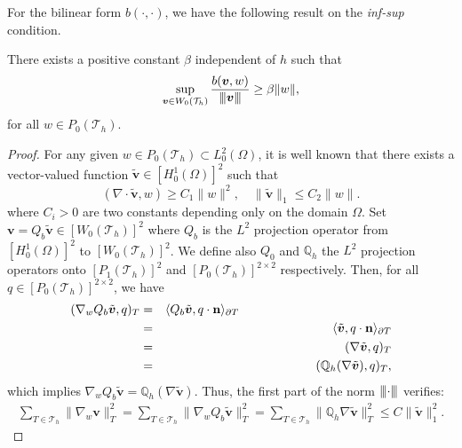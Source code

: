 \documentclass[final,leqno]{siamltex704}
\newcommand{\vertiii}[1]{{\left\vert\kern-0.25ex\left\vert\kern-0.25ex\left\vert #1
    \right\vert\kern-0.25ex\right\vert\kern-0.25ex\right\vert}}
\def\T{{\mathcal T}}
\def\bn{{\bf n}}
\begin{document}
For the bilinear form $b(\cdot,\cdot)$, we have the following result on the {\em inf-sup} condition.
\begin{lemma}\label{lemma.blinear.b}
There exists a positive constant $\beta$ independent of $h$ such that
\begin{eqnarray}\label{equ.infsup.infsup}
\sup_{\bm{v}\in W_0(\T_h)}\frac{b(\bm{v},w)}{\vertiii{\bm{v}}} \geq \beta \|w\|,
\end{eqnarray}
for all $w \in P_0(\T_h)$.
\end{lemma}
\begin{proof}
For any given $w\in P_0(\T_h) \subset L_0^2(\Omega)$, it is well known \cite{Brenner2007,Brezzi1991,Girault1986,Gunzburger1989} that there exists a vector-valued function $\tilde{\bm{v}}\in[H_0^1(\Omega)]^2$ such that
\begin{equation}
\label{infsup.finiteelement}
(\nabla \cdot \tilde{\bm{v}},w) \geq C_1\| w\|^2,\quad \|\tilde{\bm{v}}\|_1 \leq C_2 \|w\|.
\end{equation}
where $C_i>0$ are two constants depending only on the domain $\Omega$.
Set $\bm{v} = Q_b \tilde{\bm{v}} \in [W_0(\T_h)]^2$ where $Q_b$ is the $L^2$ projection operator from $[H_0^1(\Omega)]^2$ to $[W_0(\T_h)]^2$.
We define also $Q_0$ and $\mathbb{Q}_h$ the $L^2$ projection operators onto $[P_1(\T_h)]^2$ and $[P_0(\T_h)]^{2\times 2}$ respectively.
Then, for all $q \in [P_0(\T_h)]^{2\times 2}$, we have
\begin{eqnarray}
(\nabla_w Q_b \tilde{\bm{v}},q)_T
&=&\langle Q_b \tilde{\bm{v}},q \cdot \bn \rangle_{\partial T} ~~~~~~~~~~~~~~~~~~~~~~~~~~~~~~~~~~~~~\label{equ.projection.nabla}\\
&=&\langle \tilde{\bm{v}},q \cdot \bn \rangle_{\partial T} \nonumber\\
&=& (\nabla \tilde{\bm{v}},q)_T \nonumber\\
&=& (\mathbb{Q}_h (\nabla\tilde{\bm{v}}),q)_T \nonumber,
\end{eqnarray}
which implies $\nabla_w Q_b \tilde{\bm{v}} = \mathbb{Q}_h (\nabla\tilde{\bm{v}})$.
Thus, the first part of the norm $\vertiii{\cdot}$ verifies:
\begin{eqnarray}\label{equ.norm.1}
  \sum_{T\in\T_h}\|\nabla_w \bm{v} \|_T^2
= \sum_{T\in\T_h} \|\nabla_w Q_b \tilde{\bm{v}} \|_T^2
= \sum_{T\in\T_h}\| \mathbb{Q}_h\nabla \tilde{\bm{v}} \|_T^2\leq C \|\tilde{\bm{v}}\|^2_1.
\end{eqnarray}


\end{proof}
\end{document}
